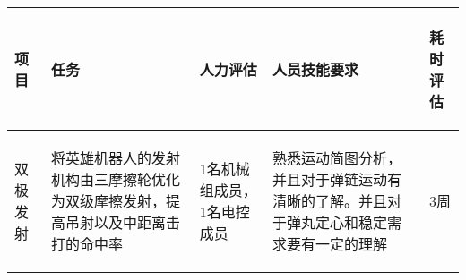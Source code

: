 
\begin{longtable}{ p{2cm} | p{3cm} | p{3cm} | p{4.8cm} | p{2cm} |}

    \hline

    \endfoot
    
    \rowcolor{tabhdcolor}

        \begin{center}
            项目
        \end{center}  &
        \begin{center}
            任务
        \end{center}  &
        \begin{center}
           人力评估
        \end{center} &
        \begin{center}
            人员技能要求
        \end{center}  &
        \begin{center}
            耗时评估
        \end{center}  \\ 
        
    \hline

    \endhead

        \begin{center}
            双极发射
        \end{center} &
        \begin{center}
            将英雄机器人的发射机构由三摩擦轮优化为双级摩擦发射，提高吊射以及中距离击打的命中率
        \end{center} &
        \begin{center}
            1名机械组成员，1名电控成员
        \end{center} &
        \begin{center}
            熟悉运动简图分析，并且对于弹链运动有清晰的了解。并且对于弹丸定心和稳定需求要有一定的理解
        \end{center} &
        \begin{center}
            3周
        \end{center}\\
        

\end{longtable}
